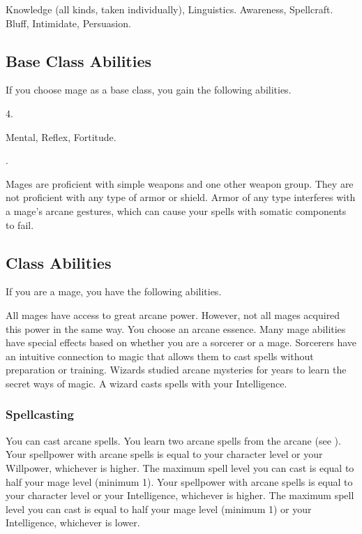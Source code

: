      Knowledge (all kinds, taken individually), Linguistics.
     Awareness, Spellcraft.
     Bluff, Intimidate, Persuasion.

    \subsection{Base Class Abilities}
        If you choose mage as a base class, you gain the following abilities.

         4.

          Mental,  Reflex,  Fortitude.

         .

        Mages are proficient with simple weapons and one other weapon group.
        They are not proficient with any type of armor or shield.
        Armor of any type interferes with a mage's arcane gestures, which can cause your spells with somatic components to fail.

    \subsection{Class Abilities}
        If you are a mage, you have the following abilities.

        All mages have access to great arcane power.
        However, not all mages acquired this power in the same way.
        You choose an arcane essence.
        Many mage abilities have special effects based on whether you are a sorcerer or a mage.
         Sorcerers have an intuitive connection to magic that allows them to cast spells without preparation or training.
         Wizards studied arcane mysteries for years to learn the secret ways of magic.
        A wizard casts spells with your Intelligence.

        \subsubsection{Spellcasting}

            You can cast arcane spells.
            You learn two arcane spells from the arcane  (see ).
             Your spellpower with arcane spells is equal to your character level or your Willpower, whichever is higher.
            The maximum spell level you can cast is equal to half your mage level (minimum 1).
             Your spellpower with arcane spells is equal to your character level or your Intelligence, whichever is higher.
            The maximum spell level you can cast is equal to half your mage level (minimum 1) or your Intelligence, whichever is lower.

